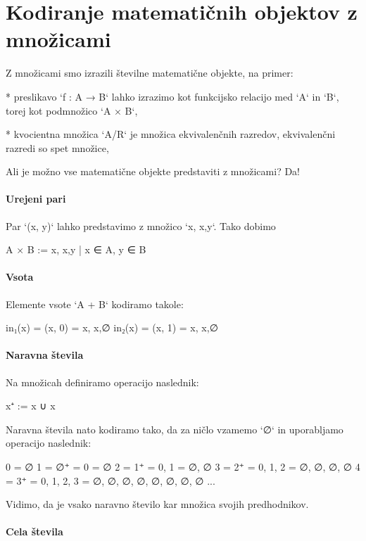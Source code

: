 \chapter{Kodiranje matematičnih objektov z množicami}

Z množicami smo izrazili številne matematične objekte, na primer:

* preslikavo `f : A → B` lahko izrazimo kot funkcijsko relacijo med `A` in `B`, torej kot
  podmnožico `A × B`,

* kvocientna množica `A/R` je množica ekvivalenčnih razredov, ekvivalenčni razredi so spet
  množice,

Ali je možno vse matematične objekte predstaviti z množicami? Da!

\subsubsection{Urejeni pari}

Par `(x, y)` lahko predstavimo z množico `{{x}, {x,y}}`. Tako dobimo

    A × B := { {{x}, {x,y}} | x ∈ A, y ∈ B }

\subsubsection{Vsota}

Elemente vsote `A + B` kodiramo takole:

     in₁(x) = (x, 0) = {{x}, {x,∅}}
     in₂(x) = (x, 1) = {{x}, {x,{∅}}}

\subsubsection{Naravna števila}

Na množicah definiramo operacijo naslednik:

    x⁺ := x ∪ {x}

Naravna števila nato kodiramo tako, da za ničlo vzamemo `∅` in uporabljamo
operacijo naslednik:

    0 = ∅
    1 = ∅⁺ = {0} = {∅}
    2 = 1⁺ = {0, 1} = {∅, {∅}}
    3 = 2⁺ = {0, 1, 2} = {∅, {∅}, {∅, {∅}}}
    4 = 3⁺ = {0, 1, 2, 3} = {∅, {∅}, {∅, {∅}}, {∅, {∅}, {∅, {∅}}}}
    ...

Vidimo, da je vsako naravno število kar množica svojih predhodnikov.

\subsubsection{Cela števila}

